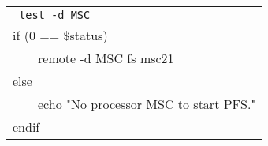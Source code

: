{\tt
  \begin{tabular}{|l|}
    \hline \tt
    test -d MSC                                   \\
    if (0 == \$status)                            \\
    \ \ \ \ remote -d MSC fs msc21                \\
    else                                          \\ 
    \ \ \ \ echo "No processor MSC to start PFS." \\
    endif                                         \\
    \hline
  \end{tabular}
}
